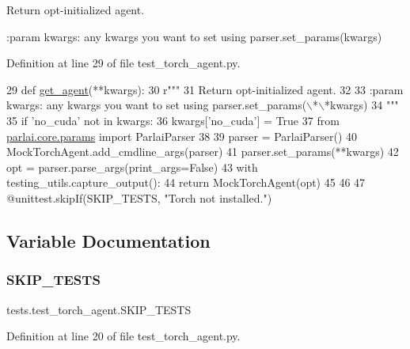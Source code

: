 \begin{DoxyVerb}Return opt-initialized agent.

:param kwargs: any kwargs you want to set using parser.set_params(\*\*kwargs)
\end{DoxyVerb}
 

Definition at line 29 of file test\+\_\+torch\+\_\+agent.\+py.


\begin{DoxyCode}
29 \textcolor{keyword}{def }\hyperlink{namespacetests_1_1test__torch__agent_ae929d109305aaea29fbfa13ecf1f32e9}{get\_agent}(**kwargs):
30     \textcolor{stringliteral}{r"""}
31 \textcolor{stringliteral}{    Return opt-initialized agent.}
32 \textcolor{stringliteral}{}
33 \textcolor{stringliteral}{    :param kwargs: any kwargs you want to set using parser.set\_params(\(\backslash\)*\(\backslash\)*kwargs)}
34 \textcolor{stringliteral}{    """}
35     \textcolor{keywordflow}{if} \textcolor{stringliteral}{'no\_cuda'} \textcolor{keywordflow}{not} \textcolor{keywordflow}{in} kwargs:
36         kwargs[\textcolor{stringliteral}{'no\_cuda'}] = \textcolor{keyword}{True}
37     \textcolor{keyword}{from} \hyperlink{namespaceparlai_1_1core_1_1params}{parlai.core.params} \textcolor{keyword}{import} ParlaiParser
38 
39     parser = ParlaiParser()
40     MockTorchAgent.add\_cmdline\_args(parser)
41     parser.set\_params(**kwargs)
42     opt = parser.parse\_args(print\_args=\textcolor{keyword}{False})
43     with testing\_utils.capture\_output():
44         \textcolor{keywordflow}{return} MockTorchAgent(opt)
45 
46 
47 @unittest.skipIf(SKIP\_TESTS, \textcolor{stringliteral}{"Torch not installed."})
\end{DoxyCode}


\subsection{Variable Documentation}
\mbox{\label{namespacetests_1_1test__torch__agent_a0ea22379520e501f5766757405f3920d}} 
\subsubsection{\texorpdfstring{S\+K\+I\+P\+\_\+\+T\+E\+S\+TS}{SKIP\_TESTS}}
{\footnotesize\ttfamily tests.\+test\+\_\+torch\+\_\+agent.\+S\+K\+I\+P\+\_\+\+T\+E\+S\+TS}



Definition at line 20 of file test\+\_\+torch\+\_\+agent.\+py.

